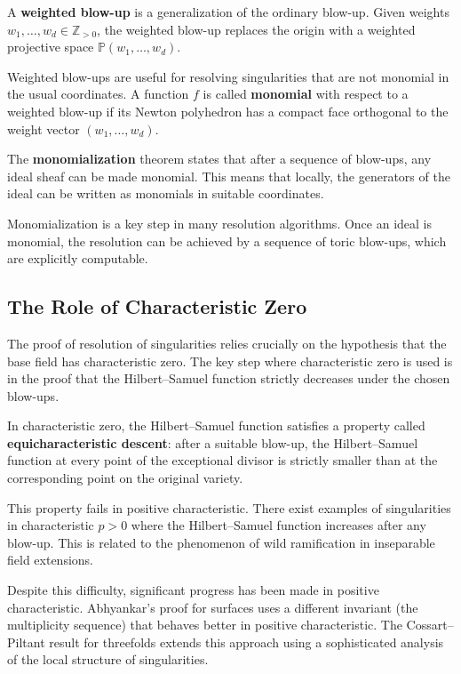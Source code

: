 A \textbf{weighted blow-up} is a generalization of the ordinary blow-up. Given weights $w_1, \ldots, w_d \in \mathbb{Z}_{>0}$, the weighted blow-up replaces the origin with a weighted projective space $\mathbb{P}(w_1, \ldots, w_d)$.

Weighted blow-ups are useful for resolving singularities that are not monomial in the usual coordinates. A function $f$ is called \textbf{monomial} with respect to a weighted blow-up if its Newton polyhedron has a compact face orthogonal to the weight vector $(w_1, \ldots, w_d)$.

The \textbf{monomialization} theorem states that after a sequence of blow-ups, any ideal sheaf can be made monomial. This means that locally, the generators of the ideal can be written as monomials in suitable coordinates.

Monomialization is a key step in many resolution algorithms. Once an ideal is monomial, the resolution can be achieved by a sequence of toric blow-ups, which are explicitly computable.

\subsection*{The Role of Characteristic Zero}

The proof of resolution of singularities relies crucially on the hypothesis that the base field has characteristic zero. The key step where characteristic zero is used is in the proof that the Hilbert--Samuel function strictly decreases under the chosen blow-ups.

In characteristic zero, the Hilbert--Samuel function satisfies a property called \textbf{equicharacteristic descent}: after a suitable blow-up, the Hilbert--Samuel function at every point of the exceptional divisor is strictly smaller than at the corresponding point on the original variety.

This property fails in positive characteristic. There exist examples of singularities in characteristic $p > 0$ where the Hilbert--Samuel function increases after any blow-up. This is related to the phenomenon of wild ramification in inseparable field extensions.

Despite this difficulty, significant progress has been made in positive characteristic. Abhyankar's proof for surfaces uses a different invariant (the multiplicity sequence) that behaves better in positive characteristic. The Cossart--Piltant result for threefolds extends this approach using a sophisticated analysis of the local structure of singularities.


